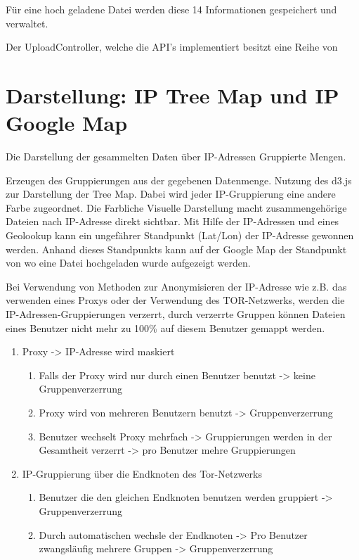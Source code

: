 \documentclass[
    fontsize=12pt,
    headings=small,
    parskip=half,           %
    bibliography=totoc,
    numbers=noenddot,       %
    open=any,               %
    ]{scrreprt}
\begin{document}
Für eine hoch geladene Datei werden diese 14 Informationen gespeichert und verwaltet.

Der UploadController, welche die API's implementiert besitzt eine Reihe von 

\section{Darstellung: IP Tree Map und IP Google Map}

Die Darstellung der gesammelten Daten über IP-Adressen Gruppierte Mengen.

Erzeugen des Gruppierungen aus der gegebenen Datenmenge. Nutzung des d3.js zur Darstellung der Tree Map. Dabei wird jeder IP-Gruppierung eine andere Farbe zugeordnet. Die Farbliche Visuelle Darstellung macht zusammengehörige Dateien nach IP-Adresse direkt sichtbar. Mit Hilfe der IP-Adressen und eines Geolookup kann ein ungefährer Standpunkt (Lat/Lon) der IP-Adresse gewonnen werden. Anhand dieses Standpunkts kann auf der Google Map der Standpunkt von wo eine Datei hochgeladen wurde aufgezeigt werden. 

Bei Verwendung von Methoden zur Anonymisieren der IP-Adresse wie z.B. das verwenden eines Proxys oder der Verwendung des TOR-Netzwerks, werden die IP-Adressen-Gruppierungen verzerrt, durch verzerrte Gruppen können Dateien eines Benutzer nicht mehr zu 100\% auf diesem Benutzer gemappt werden.

\begin{enumerate}
\item Proxy -> IP-Adresse wird maskiert
\begin{enumerate}
\item Falls der Proxy wird nur durch einen Benutzer benutzt -> keine Gruppenverzerrung 
\item Proxy wird von mehreren Benutzern benutzt -> Gruppenverzerrung 
\item Benutzer wechselt Proxy mehrfach -> Gruppierungen werden in der Gesamtheit verzerrt -> pro Benutzer mehre Gruppierungen 
\end{enumerate}
\item IP-Gruppierung über die Endknoten des Tor-Netzwerks 
\begin{enumerate}
\item Benutzer die den gleichen Endknoten benutzen werden gruppiert -> Gruppenverzerrung 
\item Durch automatischen wechsle der Endknoten -> Pro Benutzer zwangsläufig mehrere Gruppen -> Gruppenverzerrung 
\end{enumerate}
\end{enumerate}
\end{document}
